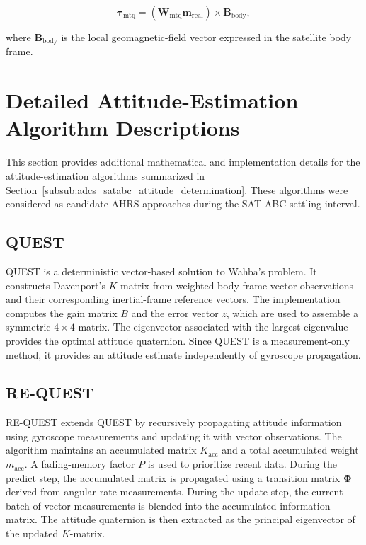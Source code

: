 \begin{equation}
    \boldsymbol{\tau}_{\mathrm{mtq}}
    =
    \left(
        \mathbf{W}_{\mathrm{mtq}}
        \mathbf{m}_{\mathrm{real}}
    \right)
    \times
    \mathbf{B}_{\mathrm{body}},
    \label{eq:app_adcs_mtq_control_torque}
\end{equation}

where \(\mathbf{B}_{\mathrm{body}}\) is the local geomagnetic-field vector expressed in the satellite body frame.

\section{Detailed Attitude-Estimation Algorithm Descriptions}
\label{app:adcs_attitude_estimation_algorithms}

This section provides additional mathematical and implementation details for the attitude-estimation algorithms summarized in Section~\ref{subsub:adcs_satabc_attitude_determination}. These algorithms were considered as candidate AHRS approaches during the SAT-ABC settling interval.

\subsection{QUEST}
\label{app:adcs_quest_algorithm}

QUEST is a deterministic vector-based solution to Wahba's problem. It constructs Davenport's \(K\)-matrix from weighted body-frame vector observations and their corresponding inertial-frame reference vectors. The implementation computes the gain matrix \(B\) and the error vector \(z\), which are used to assemble a symmetric \(4\times4\) matrix. The eigenvector associated with the largest eigenvalue provides the optimal attitude quaternion. Since QUEST is a measurement-only method, it provides an attitude estimate independently of gyroscope propagation.

\subsection{RE-QUEST}
\label{app:adcs_request_algorithm}

RE-QUEST extends QUEST by recursively propagating attitude information using gyroscope measurements and updating it with vector observations. The algorithm maintains an accumulated matrix \(K_{\mathrm{acc}}\) and a total accumulated weight \(m_{\mathrm{acc}}\). A fading-memory factor \(P\) is used to prioritize recent data. During the predict step, the accumulated matrix is propagated using a transition matrix \(\boldsymbol{\Phi}\) derived from angular-rate measurements. During the update step, the current batch of vector measurements is blended into the accumulated information matrix. The attitude quaternion is then extracted as the principal eigenvector of the updated \(K\)-matrix.

